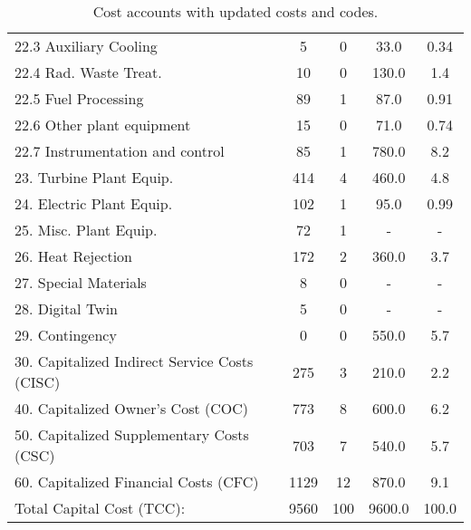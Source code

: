 \begin{table}[h!]
{\begin{tabular}{lcccc}
\hspace{10mm}22.3 Auxiliary Cooling & 5 & 0 & 33.0 & 0.34 \\
\hspace{10mm}22.4 Rad. Waste Treat. & 10 & 0 & 130.0 & 1.4 \\
\hspace{10mm}22.5 Fuel Processing & 89 & 1 & 87.0 & 0.91 \\
\hspace{10mm}22.6 Other plant equipment & 15 & 0 & 71.0 & 0.74 \\
\hspace{10mm}22.7 Instrumentation and control & 85 & 1 & 780.0 & 8.2 \\
\hspace{5mm}23. Turbine Plant Equip. & 414 & 4 & 460.0 & 4.8 \\
\hspace{5mm}24. Electric Plant Equip. & 102 & 1 & 95.0 & 0.99 \\
\hspace{5mm}25. Misc. Plant Equip. & 72 & 1 & - & - \\
\hspace{5mm}26. Heat Rejection & 172 & 2 & 360.0 & 3.7 \\
\hspace{5mm}27. Special Materials & 8 & 0 & - & - \\
\hspace{5mm}28. Digital Twin & 5 & 0 & - & - \\
\hspace{5mm}29. Contingency & 0 & 0 & 550.0 & 5.7 \\
30. Capitalized Indirect Service Costs (CISC) & 275 & 3 & 210.0 & 2.2 \\
40. Capitalized Owner’s Cost (COC) & 773 & 8 & 600.0 & 6.2 \\
50. Capitalized Supplementary Costs (CSC) & 703 & 7 & 540.0 & 5.7 \\
60. Capitalized Financial Costs (CFC) & 1129 & 12 & 870.0 & 9.1 \\
\hline
Total Capital Cost (TCC): & 9560 & 100 & 9600.0 & 100.0 \\
\hline
\end{tabular}
}
\caption{Cost accounts with updated costs and codes. }
\label{tab:costsupdatedcodes}
\end{table}


